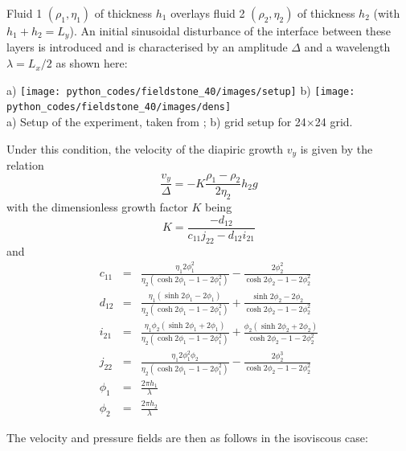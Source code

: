 Fluid 1 $(\rho_1,\eta_1)$ of thickness $h_1$ overlays 
fluid 2 $(\rho_2,\eta_2)$ of thickness $h_2$ (with $h_1+h_2=L_y$).
An initial sinusoidal disturbance of the interface between these
layers is introduced and is characterised by an amplitude $\Delta$ and a
wavelength $\lambda=L_x/2$ as shown here: 

\begin{center}
a) \texttt{[image: python\_codes/fieldstone\_40/images/setup]}
b) \texttt{[image: python\_codes/fieldstone\_40/images/dens]}\\
{\captionfont  a) Setup of the experiment, taken from \cite{thie11}; b) grid setup for 24$\times$24 grid.} 
\end{center}

Under this condition, the velocity of the diapiric growth $v_y$ is given by the relation
\[
\frac{v_y}{\Delta} = - K \frac{\rho_1-\rho_2}{2 \eta_2} h_2 g
\]
with the dimensionless growth factor $K$ being
\[
K=\frac{-d_{12}}{c_{11}j_{22}-d_{12}i_{21}}
\]
and 
\begin{eqnarray}
c_{11} &=& \frac{\eta_1 2 \phi_1^2}{\eta_2(\cosh 2\phi_1 - 1 - 2\phi_1^2)} - \frac{2\phi_2^2}{\cosh 2\phi_2 - 1 - 2 \phi_2^2}\\
d_{12} &=& \frac{\eta_1(\sinh 2\phi_1 -2\phi_1)}{\eta_2(\cosh 2\phi_1 -1 -2\phi_1^2)} + \frac{\sinh 2\phi_2 - 2\phi_2}{\cosh 2\phi_2 -1 -2\phi_2^2} \\
i_{21} &=& \frac{\eta_1\phi_2 (\sinh 2 \phi_1 + 2 \phi_1)}{\eta_2(\cosh 2\phi_1 -1 -2\phi_1^2)} 
+ \frac{\phi_2 (\sinh 2\phi_2 + 2\phi_2)}{\cosh 2\phi_2 -1 -2\phi_2^2} \\
j_{22} &=& \frac{\eta_1 2 \phi_1^2 \phi_2}{\eta_2(\cosh 2\phi_1 -1-2\phi_1^2)} - \frac{2\phi_2^3}{ \cosh 2\phi_2 -1 -2\phi_2^2}\\
\phi_1&=&\frac{2\pi h_1}{\lambda}\\
\phi_2&=&\frac{2\pi h_2}{\lambda}
\end{eqnarray}

The velocity and pressure fields are then as follows in the isoviscous case:

